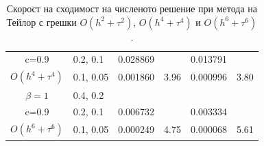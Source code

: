 \documentclass{beamer}
\begin{document}
\begin{frame}
\begin{table}[ht]
{\begin{tabular}{||c|l|ll|ll||}
       c=0.9                 &0.2, 0.1     & 0.028869   &        &  0.013791   &   \\
 $O(h^4+ \tau^4)$ 	&0.1, 0.05   	&0.001860 	& 3.96  & 0.000996  & 3.80  \\
\hline
  $\beta=1$     		&0.4, 0.2   	&            	&          	&                  &      \\
      c=0.9                  &0.2, 0.1   	&0.006732 	&            & 0.003334      &       \\
 $O(h^6+ \tau^6)$ 	&0.1, 0.05 	& 0.000249 	& 4.75 	& 0.000068  & 5.61        \\
\hline
\hline 
		\end{tabular}
		}%
		\caption{Скорост на сходимост на численото решение при метода на Тейлор с грешки $O(h^{2} + \tau^2 )$, $O(h^{4} + \tau^4 )$ и $O(h^{6} + \tau^6 )$. }
\label{table:A}
\end{table}

\end{frame}
\end{document}
